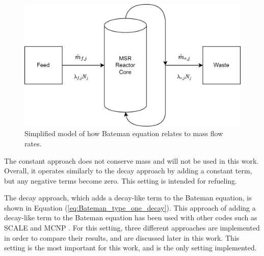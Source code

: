 \begin{figure}[H]
  \centering
  \includegraphics[scale=0.15]{images/msr-feed-repr.png}
  \caption{Simplified model of how Bateman equation relates to mass flow rates.}
   \label{fig:msr-outline-fig-show}
\end{figure}


The constant approach does not conserve mass and will not be used in this work. Overall, it operates similarly to the decay approach by adding a constant term, but any negative terms become zero. This setting is intended for refueling.

The decay approach, which adds a decay-like term to the Bateman equation, is shown in Equation (\ref{eq:Bateman_type_one_decay}). This approach of adding a decay-like term to the Bateman equation has been used with other codes such as SCALE and MCNP \cite{jr_vicente_valdez_modeling_2020, rodriguez-vieitez_transmutation_2002}. For this setting, three different approaches are implemented in order to compare their results, and are discussed later in this work. This setting is the most important for this work, and is the only setting implemented.



